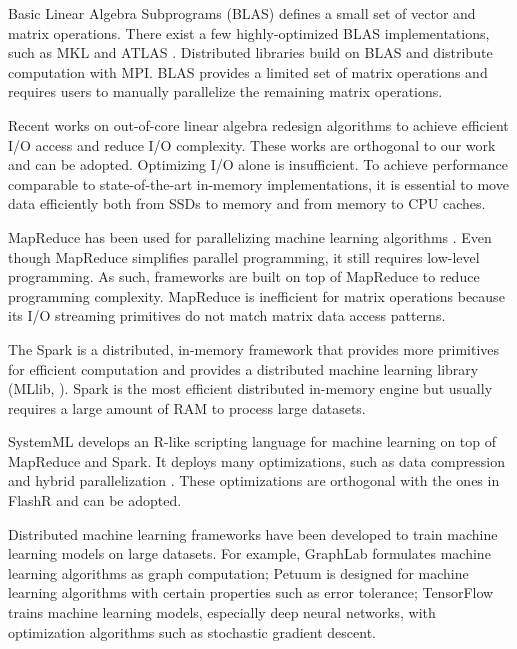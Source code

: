 Basic Linear Algebra Subprograms (BLAS) defines a small set of vector and
matrix operations. There exist a few highly-optimized BLAS implementations,
such as MKL \cite{mkl} and ATLAS \cite{atlas}. 
Distributed libraries \cite{trilinos, petsc, elemental}
build on BLAS and distribute computation with MPI.
BLAS provides a limited set of matrix operations and requires
users to manually parallelize the remaining matrix operations.

Recent works on out-of-core linear algebra \cite{Toledo99, Quintana-Orti12}
redesign algorithms to achieve efficient I/O access and reduce I/O
complexity. These works are orthogonal to our work and can be adopted.
Optimizing I/O
alone is insufficient. To achieve performance comparable to state-of-the-art
in-memory implementations, it is essential to move data efficiently both from
SSDs to memory and from memory to CPU caches.

MapReduce \cite{mapreduce} has been used for parallelizing machine learning
algorithms \cite{Chu06}. Even though MapReduce simplifies parallel programming,
it still requires low-level programming. As such, frameworks are built on top
of MapReduce to reduce programming complexity. MapReduce is inefficient for
matrix operations because
its I/O streaming primitives do not match matrix data access patterns.

The Spark \cite{spark} is a distributed, in-memory framework that provides more
primitives for efficient computation and provides a distributed machine
learning library (MLlib, \cite{mllib}). Spark is the most efficient distributed
in-memory engine but usually requires a large amount of RAM to process large
datasets.

SystemML \cite{systemml, systemml2} develops an R-like scripting language for
machine learning on top of MapReduce and Spark. It deploys many optimizations,
such as data compression \cite{Elgohary16} and hybrid parallelization
\cite{Boehm14}. These optimizations are orthogonal with the ones in FlashR
and can be adopted.

Distributed machine learning frameworks have been developed to train machine
learning models on large datasets. For example, GraphLab \cite{graphlab}
formulates machine learning algorithms as graph computation; Petuum \cite{petuum}
is designed for machine learning algorithms with certain properties such as
error tolerance; TensorFlow \cite{tensorflow} trains machine learning models,
especially deep neural networks, with optimization algorithms such as
stochastic gradient descent.

